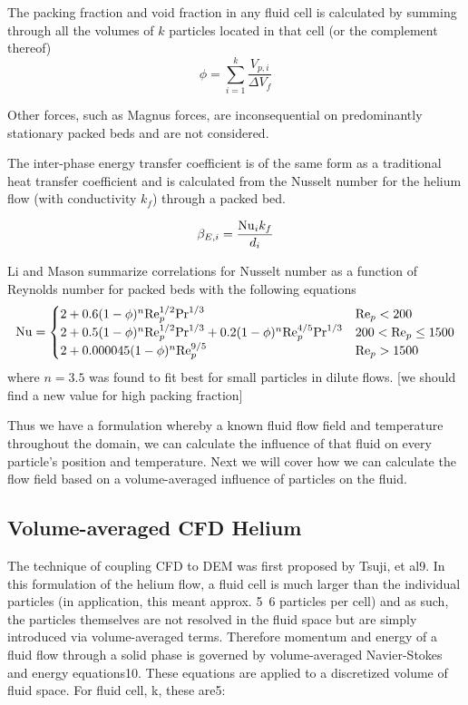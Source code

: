 The packing fraction and  void fraction in any fluid cell is calculated by summing through all the volumes of $k$ particles located in that cell (or the complement thereof)
\begin{equation}
\phi = \sum_{i=1}^k \frac{V_{p,i}}{\Delta V_f}
\end{equation}

Other forces, such as Magnus forces, are inconsequential on predominantly stationary packed beds and are not considered.



The inter-phase energy transfer coefficient is of the same form as a traditional heat transfer coefficient and is calculated from the Nusselt number for the helium flow (with conductivity $k_f$) through a packed bed.

\begin{equation}
\beta_{E,i} = \frac{\mathrm{Nu}_i k_f}{d_i}
\end{equation}

Li and Mason\cite{Li2000} summarize correlations for Nusselt number as a function of Reynolds number for packed beds with the following equations
\[
\mathrm{Nu}= 
\begin{cases}
    2 + 0.6(1-\phi)^n\mathrm{Re}_p^{1/2}\mathrm{Pr}^{1/3}											& \mathrm{Re}_p < 200 \\
    2 + 0.5(1-\phi)^n\mathrm{Re}_p^{1/2}\mathrm{Pr}^{1/3} + 0.2(1-\phi)^n\mathrm{Re}_p^{4/5}\mathrm{Pr}^{1/3}   & 200 < \mathrm{Re}_p \le 1500 \\
    2 + 0.000045(1-\phi)^n\mathrm{Re}_p^{9/5}												& \mathrm{Re}_p > 1500
\end{cases}
\]
where $n=3.5$ was found to fit best for small particles in dilute flows. [we should find a new value for high packing fraction] 

Thus we have a formulation whereby a known fluid flow field and temperature throughout the domain, we can calculate the influence of that fluid on every particle’s position and temperature. Next we will cover how we can calculate the flow field based on a volume-averaged influence of particles on the fluid.




\subsection{Volume-averaged CFD Helium}
The technique of coupling CFD to DEM was first proposed by Tsuji, et al9. In this formulation of the helium flow, a fluid cell is much larger than the individual particles (in application, this meant approx. 5~6 particles per cell) and as such, the particles themselves are not resolved in the fluid space but are simply introduced via volume-averaged terms. Therefore momentum and energy of a fluid flow through a solid phase is governed by volume-averaged Navier-Stokes and energy equations10. These equations are applied to a discretized volume of fluid space. For fluid cell, k, these are5:



